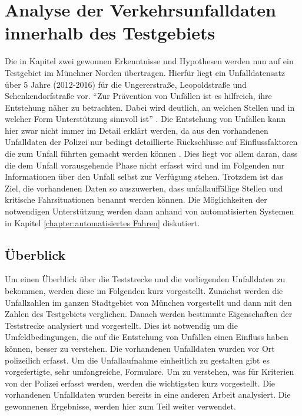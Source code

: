 
\chapter{Analyse der Verkehrsunfalldaten innerhalb des Testgebiets}\label{chapter:Datenauswertung}
Die in Kapitel zwei gewonnen Erkenntnisse und Hypothesen werden nun auf ein Testgebiet im Münchner Norden übertragen. Hierfür liegt ein Unfalldatensatz über 5 Jahre (2012-2016) für die Ungererstraße, Leopoldstraße und Schenkendorfstraße vor. \enquote{Zur Prävention von Unfällen ist es hilfreich, ihre Entstehung näher zu betrachten. Dabei wird deutlich, an welchen Stellen und in welcher Form Unterstützung sinnvoll ist} \parencite[S.43]{Fricke.2006}. Die Entstehung von Unfällen kann hier zwar nicht immer im Detail erklärt werden, da aus den vorhandenen Unfalldaten der Polizei nur bedingt detaillierte Rückschlüsse auf Einflussfaktoren die zum Unfall führten gemacht werden können \parencite{Reichart.2001}. Dies liegt vor allem daran, dass die dem Unfall vorausgehende Phase nicht erfasst wird und im Folgenden nur Informationen über den Unfall selbst zur Verfügung stehen. Trotzdem ist das Ziel, die vorhandenen Daten so auszuwerten, dass unfallauffällige Stellen und kritische Fahrsituationen benannt werden können. Die Möglichkeiten der notwendigen Unterstützung werden dann anhand von automatisierten Systemen in Kapitel \ref{chapter:automatisiertes Fahren} diskutiert.


\section{Überblick}
Um einen Überblick über die Teststrecke und die vorliegenden Unfalldaten zu bekommen, werden diese im Folgenden kurz vorgestellt. Zunächst werden die Unfallzahlen im ganzen Stadtgebiet von München vorgestellt und dann mit den Zahlen des Testgebiets verglichen. Danach werden bestimmte Eigenschaften der Teststrecke analysiert und vorgestellt. Dies ist notwendig um die Umfeldbedingungen, die auf die Entstehung von Unfällen einen Einfluss haben können, besser zu verstehen. Die vorhandenen Unfalldaten wurden vor Ort polizeilich erfasst. Um die Unfallaufnahme einheitlich zu gestalten gibt es vorgefertigte, sehr umfangreiche, Formulare. Um zu verstehen, was für Kriterien von der Polizei erfasst werden, werden die wichtigsten kurz vorgestellt. Die vorhandenen Unfalldaten wurden bereits in eine anderen Arbeit analysiert. Die gewonnenen Ergebnisse, werden hier zum Teil weiter verwendet.

